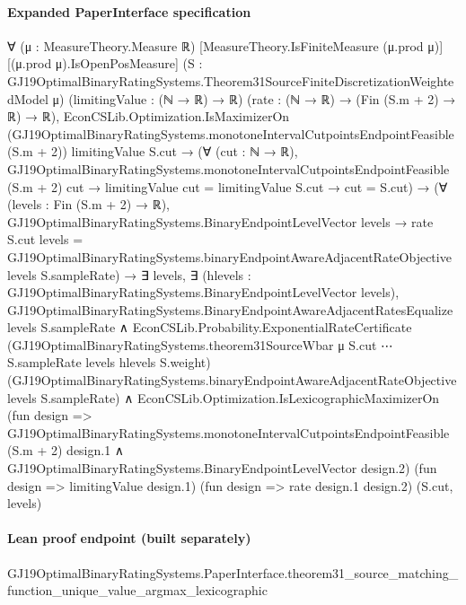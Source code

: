 \documentclass[10pt]{article}
\begin{document}
\paragraph{Expanded PaperInterface specification}
\begin{ReviewVerbatim}
∀ (μ : MeasureTheory.Measure ℝ) [MeasureTheory.IsFiniteMeasure (μ.prod μ)] [(μ.prod μ).IsOpenPosMeasure]
  (S : GJ19OptimalBinaryRatingSystems.Theorem31SourceFiniteDiscretizationWeightedModel μ) (limitingValue : (ℕ → ℝ) → ℝ)
  (rate : (ℕ → ℝ) → (Fin (S.m + 2) → ℝ) → ℝ),
  EconCSLib.Optimization.IsMaximizerOn
      (GJ19OptimalBinaryRatingSystems.monotoneIntervalCutpointsEndpointFeasible (S.m + 2)) limitingValue S.cut →
    (∀ (cut : ℕ → ℝ),
        GJ19OptimalBinaryRatingSystems.monotoneIntervalCutpointsEndpointFeasible (S.m + 2) cut →
          limitingValue cut = limitingValue S.cut → cut = S.cut) →
      (∀ (levels : Fin (S.m + 2) → ℝ),
          GJ19OptimalBinaryRatingSystems.BinaryEndpointLevelVector levels →
            rate S.cut levels =
              GJ19OptimalBinaryRatingSystems.binaryEndpointAwareAdjacentRateObjective levels S.sampleRate) →
        ∃ levels,
          ∃ (hlevels : GJ19OptimalBinaryRatingSystems.BinaryEndpointLevelVector levels),
            GJ19OptimalBinaryRatingSystems.BinaryEndpointAwareAdjacentRatesEqualize levels S.sampleRate ∧
              EconCSLib.Probability.ExponentialRateCertificate
                  (GJ19OptimalBinaryRatingSystems.theorem31SourceWbar μ S.cut ⋯ S.sampleRate levels hlevels S.weight)
                  (GJ19OptimalBinaryRatingSystems.binaryEndpointAwareAdjacentRateObjective levels S.sampleRate) ∧
                EconCSLib.Optimization.IsLexicographicMaximizerOn
                  (fun design =>
                    GJ19OptimalBinaryRatingSystems.monotoneIntervalCutpointsEndpointFeasible (S.m + 2) design.1 ∧
                      GJ19OptimalBinaryRatingSystems.BinaryEndpointLevelVector design.2)
                  (fun design => limitingValue design.1) (fun design => rate design.1 design.2) (S.cut, levels)
\end{ReviewVerbatim}

\paragraph{Lean proof endpoint (built separately)}\begin{ReviewVerbatim}
GJ19OptimalBinaryRatingSystems.PaperInterface.theorem31_source_matching_function_unique_value_argmax_lexicographic
\end{ReviewVerbatim}
\end{document}
